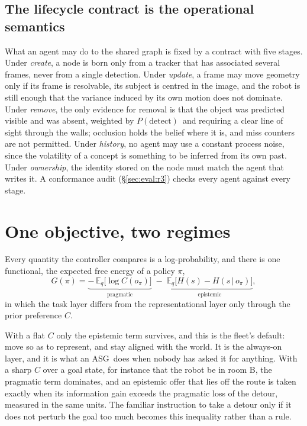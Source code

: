 \documentclass[10pt,twocolumn]{IEEEtran}
\newcommand{\asg}{ASG}
\newcommand{\efe}{\ensuremath{G}}
\newcommand{\pdet}{\ensuremath{P(\mathrm{detect})}}
\begin{document}
\subsection{The lifecycle contract is the operational semantics}

What an agent may do to the shared graph is fixed by a contract with five stages. Under
\emph{create}, a node is born only from a tracker that has associated several frames, never from a
single detection. Under \emph{update}, a frame may move geometry only if its frame is resolvable, its
subject is centred in the image, and the robot is still enough that the variance induced by its own
motion does not dominate. Under \emph{remove}, the only evidence for removal is that the object was
predicted visible and was absent, weighted by \pdet\ and requiring a clear line of sight through the
walls; occlusion holds the belief where it is, and miss counters are not permitted. Under
\emph{history}, no agent may use a constant process noise, since the volatility of a concept is
something to be inferred from its own past. Under \emph{ownership}, the identity stored on the node
must match the agent that writes it. A conformance audit (\S\ref{sec:eval:r3}) checks every agent
against every stage.

\section{One objective, two regimes}\label{sec:efe}

Every quantity the controller compares is a log-probability, and there is one functional, the
expected free energy of a policy $\pi$,
\begin{equation}
\efe(\pi) = \underbrace{-\,\mathbb{E}_{q}\big[\log C(o_\pi)\big]}_{\text{pragmatic}}
\;-\;\underbrace{\mathbb{E}_{q}\big[H(s) - H(s\,|\,o_\pi)\big]}_{\text{epistemic}},
\label{eq:efe}
\end{equation}
in which the task layer differs from the representational layer only through the prior preference
$C$.

With a flat $C$ only the epistemic term survives, and this is the fleet's default: move so as to
represent, and stay aligned with the world. It is the always-on layer, and it is what an \asg\ does
when nobody has asked it for anything. With a sharp $C$ over a goal state, for instance that the
robot be in room B, the pragmatic term dominates, and an epistemic offer that lies off the route is
taken exactly when its information gain exceeds the pragmatic loss of the detour, measured in the same
units. The familiar instruction to take a detour only if it does not perturb the goal too much becomes
this inequality rather than a rule.
\end{document}
